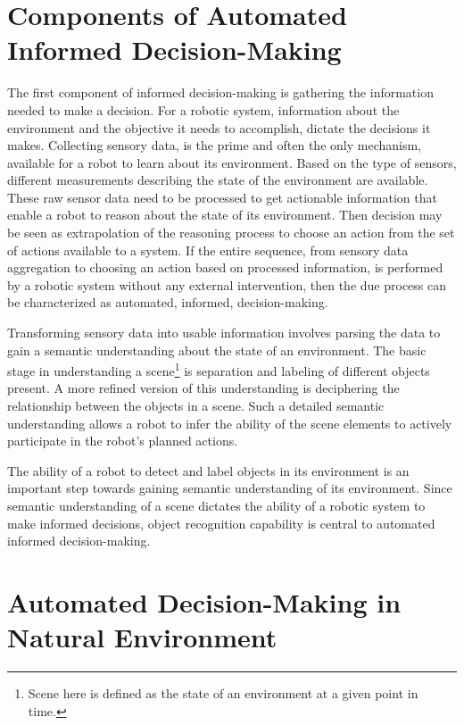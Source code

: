 \documentclass {udthesis}
\begin{document}
\section{Components of Automated Informed Decision-Making}

The first component of informed decision-making is gathering the information needed to make a decision. 
For a robotic system,
information about the environment and the objective it needs to accomplish, dictate the decisions it makes. 
Collecting sensory data, is the prime 
and often the only mechanism, available for a robot to learn about its environment. Based on the 
type of sensors, different measurements describing the state of the environment are available. 
These raw sensor data need to be processed to get actionable information that enable a robot to reason about the state of its environment. 
Then decision may be seen as extrapolation of the reasoning process to choose an action from the set of actions available to a system.
If the entire sequence, from sensory data aggregation to choosing an action based on processed information, is performed by
a robotic system without any external intervention, then the due process can be characterized as automated, informed, decision-making. 

Transforming sensory data into usable information involves parsing the data to gain a semantic understanding about the state of an environment.
The basic stage in understanding a scene\footnote{Scene here is defined as the state of an environment at a given point in time.} is separation and labeling of different objects present.
A more refined version of this understanding is deciphering the relationship between the objects in a scene.
Such a detailed semantic understanding allows a robot to infer the ability of the scene elements 
to actively participate in the robot's planned actions.

The ability of a robot to detect and label objects in its environment is an important step towards gaining semantic understanding of its environment.
Since semantic understanding of a scene dictates the ability of a robotic system to make informed decisions, object recognition capability
is central to automated informed decision-making.

\section{Automated Decision-Making in Natural Environment}
\end{document}
